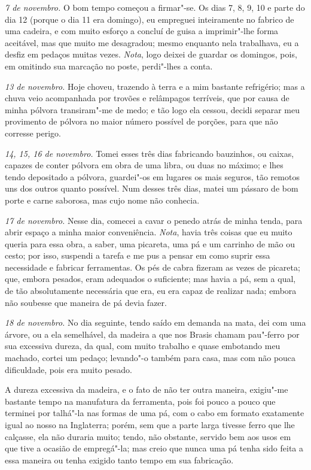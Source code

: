 \emph{7 de novembro.} O bom tempo começou a firmar"-se. Os dias 7, 8, 9,
10 e parte do dia 12 (porque o dia 11 era domingo), eu empreguei
inteiramente no fabrico de uma cadeira, e com muito esforço a concluí de
guisa a imprimir"-lhe forma aceitável, mas que muito me desagradou; mesmo
enquanto nela trabalhava, eu a desfiz em pedaços muitas vezes.
\emph{Nota}, logo deixei de guardar os domingos, pois, em omitindo sua
marcação no poste, perdi"-lhes a conta.

\emph{13 de novembro.} Hoje choveu, trazendo à terra e a mim bastante
refrigério; mas a chuva veio acompanhada por trovões e relâmpagos
terríveis, que por causa de minha pólvora transiram"-me de medo; e tão
logo ela cessou, decidi separar meu provimento de pólvora no maior
número possível de porções, para que não corresse perigo.

\emph{14, 15, 16 de novembro.} Tomei esses três dias fabricando
bauzinhos, ou caixas, capazes de conter pólvora em obra de uma libra, ou
duas no máximo; e lhes tendo depositado a pólvora, guardei"-os em lugares
os mais seguros, tão remotos uns dos outros quanto possível. Num desses
três dias, matei um pássaro de bom porte e carne saborosa, mas cujo nome
não conhecia.

\emph{17 de novembro.} Nesse dia, comecei a cavar o penedo atrás de
minha tenda, para abrir espaço a minha maior conveniência. \emph{Nota},
havia três coisas que eu muito queria para essa obra, a saber, uma
picareta, uma pá e um carrinho de mão ou cesto; por isso, suspendi a
tarefa e me pus a pensar em como suprir essa necessidade e fabricar
ferramentas. Os pés de cabra fizeram as vezes de picareta; que, embora
pesados, eram adequados o suficiente; mas havia a pá, sem a qual, de tão
absolutamente necessária que era, eu era capaz de realizar nada; embora
não soubesse que maneira de pá devia fazer.

\emph{18 de novembro.} No dia seguinte, tendo saído em demanda na mata,
dei com uma árvore, ou a ela semelhável, da madeira a que nos Brasis
chamam pau"-ferro por sua excessiva dureza, da qual, com muito trabalho e
quase embotando meu machado, cortei um pedaço; levando"-o também para
casa, mas com não pouca dificuldade, pois era muito pesado.

A dureza excessiva da madeira, e o fato de não ter outra maneira,
exigiu"-me bastante tempo na manufatura da ferramenta, pois foi pouco a
pouco que terminei por talhá"-la nas formas de uma pá, com o cabo em
formato exatamente igual ao nosso na Inglaterra; porém, sem que a parte
larga tivesse ferro que lhe calçasse, ela não duraria muito; tendo, não
obstante, servido bem aos usos em que tive a ocasião de empregá"-la; mas
creio que nunca uma pá tenha sido feita a essa maneira ou tenha exigido
tanto tempo em sua fabricação.

